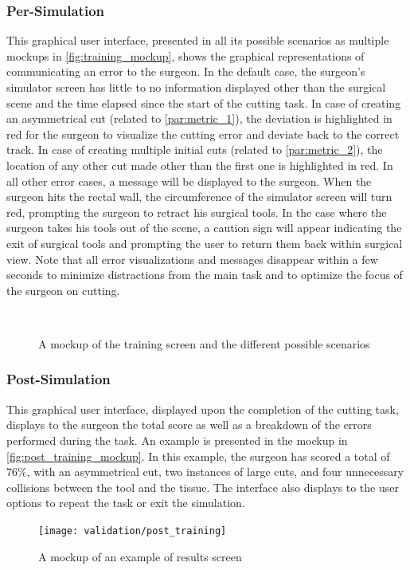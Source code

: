 \subsubsection{Per-Simulation}
This graphical user interface, presented in all its possible scenarios as multiple mockups in \autoref{fig:training_mockup}, shows the graphical representations of communicating an error to the surgeon. In the default case, the surgeon's simulator screen has little to no information displayed other than the surgical scene and the time elapsed since the start of the cutting task. In case of creating an asymmetrical cut (related to \autoref{par:metric_1}), the deviation is highlighted in red for the surgeon to visualize the cutting error and deviate back to the correct track. In case of creating multiple initial cuts (related to \autoref{par:metric_2}), the location of any other cut made other than the first one is highlighted in red. In all other error cases, a message will be displayed to the surgeon.
When the surgeon hits the rectal wall, the circumference of the simulator screen will turn red, prompting the surgeon to retract his surgical tools. In the case where the surgeon takes his tools out of the scene, a caution sign will appear indicating the exit of surgical tools and prompting the user to return them back within surgical view.
Note that all error visualizations and messages disappear within a few seconds to minimize distractions from the main task and to optimize the focus of the surgeon on cutting.
\begin{figure}
  \centering%
  \hfill%
  \\
  \hfill%
  \caption{A mockup of the training screen and the different possible scenarios}\label{fig:training_mockup}
\end{figure}

\subsubsection{Post-Simulation}
This graphical user interface, displayed upon the completion of the cutting task, displays to the surgeon the total score as well as a breakdown of the errors performed during the task. An example is presented in the mockup in \autoref{fig:post_training_mockup}. In this example, the surgeon has scored a total of 76\%, with an asymmetrical cut, two instances of large cuts, and four unnecessary collisions between the tool and the tissue. The interface also displays to the user options to repeat the task or exit the simulation.
\begin{figure}
  \centering%
  \texttt{[image: validation/post\_training]}
  \caption{A mockup of an example of results screen}\label{fig:post_training_mockup}
\end{figure}

